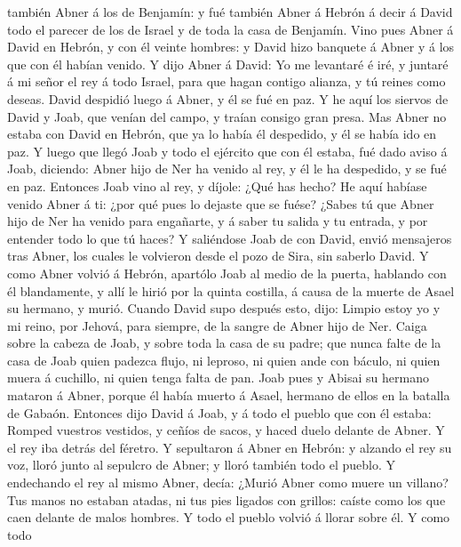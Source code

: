 también Abner á los de Benjamín: y fué también Abner á Hebrón á decir á
David todo el parecer de los de Israel y de toda la casa de Benjamín.
 Vino pues Abner á David en Hebrón, y con él veinte
hombres: y David hizo banquete á Abner y á los que con él habían venido.
 Y dijo Abner á David: Yo me levantaré é iré, y juntaré á
mi señor el rey á todo Israel, para que hagan contigo alianza, y tú
reines como deseas. David despidió luego á Abner, y él se fué en paz.
 Y he aquí los siervos de David y Joab, que venían del
campo, y traían consigo gran presa. Mas Abner no estaba con David en
Hebrón, que ya lo había él despedido, y él se había ido en paz.
 Y luego que llegó Joab y todo el ejército que con él
estaba, fué dado aviso á Joab, diciendo: Abner hijo de Ner ha venido al
rey, y él le ha despedido, y se fué en paz.  Entonces
Joab vino al rey, y díjole: ¿Qué has hecho? He aquí habíase venido Abner
á ti: ¿por qué pues lo dejaste que se fuése?  ¿Sabes tú
que Abner hijo de Ner ha venido para engañarte, y á saber tu salida y tu
entrada, y por entender todo lo que tú haces?  Y
saliéndose Joab de con David, envió mensajeros tras Abner, los cuales le
volvieron desde el pozo de Sira, sin saberlo David.  Y
como Abner volvió á Hebrón, apartólo Joab al medio de la puerta,
hablando con él blandamente, y allí le hirió por la quinta costilla, á
causa de la muerte de Asael su hermano, y murió.  Cuando
David supo después esto, dijo: Limpio estoy yo y mi reino, por Jehová,
para siempre, de la sangre de Abner hijo de Ner.  Caiga
sobre la cabeza de Joab, y sobre toda la casa de su padre; que nunca
falte de la casa de Joab quien padezca flujo, ni leproso, ni quien ande
con báculo, ni quien muera á cuchillo, ni quien tenga falta de pan.
 Joab pues y Abisai su hermano mataron á Abner, porque él
había muerto á Asael, hermano de ellos en la batalla de Gabaón.
 Entonces dijo David á Joab, y á todo el pueblo que con
él estaba: Romped vuestros vestidos, y ceñíos de sacos, y haced duelo
delante de Abner. Y el rey iba detrás del féretro.  Y
sepultaron á Abner en Hebrón: y alzando el rey su voz, lloró junto al
sepulcro de Abner; y lloró también todo el pueblo.  Y
endechando el rey al mismo Abner, decía: ¿Murió Abner como muere un
villano?  Tus manos no estaban atadas, ni tus pies
ligados con grillos: caíste como los que caen delante de malos hombres.
Y todo el pueblo volvió á llorar sobre él.  Y como todo
